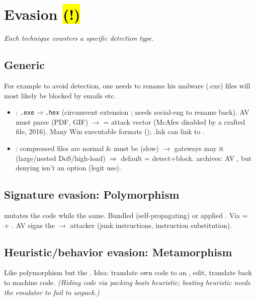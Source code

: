 \section{Evasion \hl{(!)}}
\textit{Each technique counters a specific detection type.}

\subsection{Generic}

For example to avoid detection, one needs to rename his malware (.exe) files will most likely be blocked by emails etc.

\begin{itemize}
\item {}:  \texttt{.exe}$\to$\texttt{.hex} (circumvent extension ; needs social-eng to rename back). AV must parse  (PDF, GIF) $\to$  = attack vector (McAfee disabled by a crafted file, 2016). Many Win executable formats (); .lnk can link to .
\item {}: compressed files are normal \& must be  (slow) $\to$ gateways may  it (large/nested  DoS/high-load) $\Rightarrow$ default = detect+block.  archives: AV , but denying isn't an option (legit use).
\end{itemize}

\subsection{Signature evasion: Polymorphism}
 mutates the code while  the same. Bundled (self-propagating) or applied . Via  =  + . AV signs the  $\to$ attacker  (junk instructions, instruction substitution).

\subsection{Heuristic/behavior evasion: Metamorphism}
Like polymorphism but the . Idea: translate own code to an , edit, translate back to machine code. \textit{(Hiding code via packing beats  heuristic; beating  heuristic needs the emulator to fail to unpack.)}

